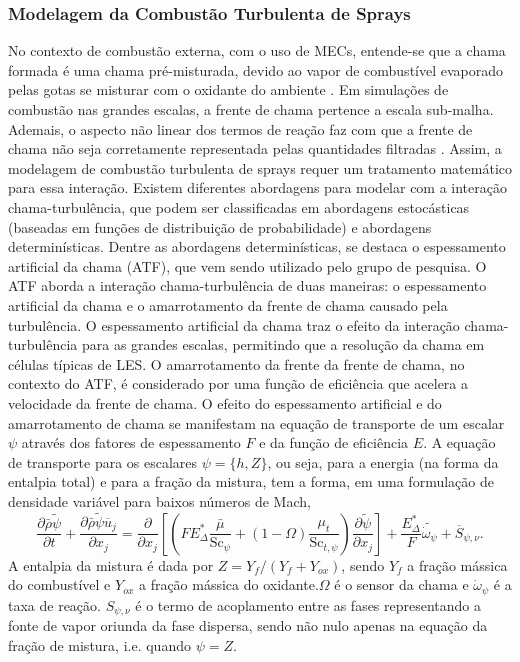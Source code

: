 \subsubsection{Modelagem da Combustão Turbulenta de Sprays} \label{sec:comb-sprays}
No contexto de combustão externa, com o uso de MECs, entende-se que a chama formada é uma chama pré-misturada, devido ao vapor de combustível evaporado pelas gotas se misturar com o oxidante do ambiente \cite{PoinsotVeynante2005}.
Em simulações de combustão nas grandes escalas, a frente de chama pertence a escala sub-malha.
Ademais, o aspecto não linear dos termos de reação faz com que a frente de chama não seja corretamente representada pelas quantidades filtradas \cite{SacomanoF2017PhD}.
Assim, a modelagem de combustão turbulenta de sprays requer um tratamento matemático para essa interação.
Existem diferentes abordagens para modelar com a interação chama-turbulência, que podem ser classificadas em abordagens estocásticas (baseadas em funções de distribuição de probabilidade) e abordagens determinísticas.
Dentre as abordagens determinísticas, se destaca o espessamento artificial da chama (ATF), que vem sendo utilizado pelo grupo de pesquisa.
O ATF aborda a interação chama-turbulência de duas maneiras: o espessamento artificial da chama e o amarrotamento da frente de chama causado pela turbulência.
O espessamento artificial da chama traz o efeito da interação chama-turbulência para as grandes escalas, permitindo que a resolução da chama em células típicas de LES.
O amarrotamento da frente da frente de chama, no contexto do ATF, é considerado por uma função de eficiência que acelera a velocidade da frente de chama.
O efeito do espessamento artificial e do amarrotamento de chama se manifestam na equação de transporte de um escalar $\psi$ através dos fatores de espessamento $F$ e da função de eficiência $E$.
A equação de transporte para os escalares  $\psi=\lbrace h, Z\rbrace$, ou seja, para a energia (na forma da entalpia total) e para a fração da mistura, tem a forma, em uma formulação de densidade variável para baixos números de Mach,
\begin{equation}
    \frac{\partial \bar \rho \widetilde \psi}{\partial t} + 
    \frac{\partial \bar \rho \widetilde \psi \overline u_j}{\partial x_j} =
    \frac{\partial }{\partial x_j} \left[ \left(
    FE^*_\Delta \frac{\bar\mu}{\text{Sc}_\psi} + (1-\Omega)\frac{\mu_t}{\text{Sc}_{t,\psi}}
    \right) \frac{\partial \widetilde \psi}{\partial x_j}
    \right] +
    \frac{E^*_\Delta}{F}\widetilde{\dot{\omega}_\psi} + 
    \overline S_{\psi,\nu}.
    \label{eq:FGM}
\end{equation}
A entalpia da mistura é dada por $Z=Y_f/{(Y_f+Y_{ox})}$, sendo $Y_f$ a fração mássica do combustível e $Y_{ox}$ a fração mássica do oxidante.$\Omega$ é o sensor da chama e $\dot \omega_\psi$ é a taxa de reação. 
$S_{\psi,\nu}$ é o termo de acoplamento entre as fases representando a fonte de vapor oriunda da fase dispersa, sendo não nulo apenas na equação da fração de mistura, i.e. quando $\psi=Z$.

